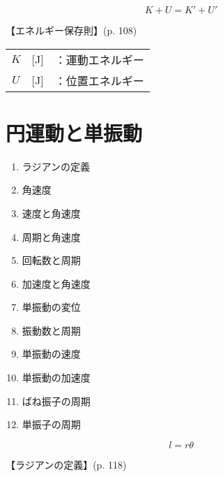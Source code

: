 \documentclass[10pt]{jarticle}
\begin{document}
\newpage
\[
	K + U = K' + U'
\]


\vskip3mm
【エネルギー保存則】{\footnotesize (p. 108)}

\begin{tabular}{ccl}
$K$	&[J]	&：運動エネルギー\\
$U$	&[J]	&：位置エネルギー
\end{tabular}





\newpage
\addtocounter{page}{-1}
\thispagestyle{empty}
\section{円運動と単振動}

\begin{enumerate}
\setcounter{enumi}{\thepage}
\small
\itemsep-4mm
\item ラジアンの定義\\
\item \vskip-1mm 角速度\\
\item \vskip-1mm 速度と角速度\\
\item \vskip-1mm 周期と角速度\\
\item \vskip-1mm 回転数と周期\\
\item \vskip-1mm 加速度と角速度\\
\item \vskip-1mm 単振動の変位 \\
\item \vskip-1mm 振動数と周期\\
\item \vskip-1mm 単振動の速度 \\
\item \vskip-1mm 単振動の加速度 \\
\item \vskip-1mm ばね振子の周期\\
\item \vskip-1mm 単振子の周期
\end{enumerate}



\newpage
\[
l = r \theta
\]


\vskip3mm
【ラジアンの定義】{\footnotesize (p. 118)}
\end{document}
